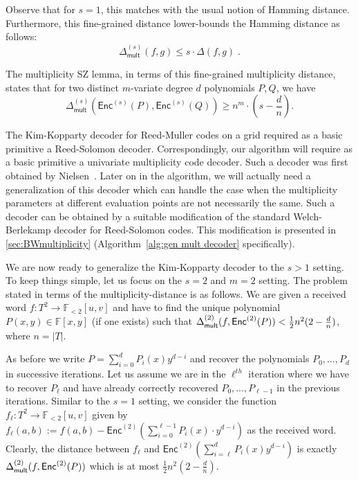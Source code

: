 \documentclass{theoretics}
\def\Field{\mathbb{F}}
\let\F\Field
\newcommand{\enc}{{\mathsf{Enc}}}
\begin{document}
	Observe that for $s=1$, this matches with the usual notion of Hamming
	distance. Furthermore, this fine-grained distance lower-bounds the
	Hamming distance as follows:
	\[ \Delta_{\mathsf{mult}}^{(s)}(f,g) \leq s \cdot \Delta(f,g)
	\;. \]
	
	The multiplicity SZ lemma, in terms of this fine-grained
	multiplicity distance, states that for two distinct $m$-variate degree $d$
	polynomials $P,Q$, we have
	\[\Delta_{\mathsf{mult}}^{(s)} (\enc^{(s)}(P),\enc^{(s)}(Q))\geq n^{m} \cdot \left(s - \frac{d}{n}\right).\]
	
	The Kim-Kopparty decoder for Reed-Muller codes on a grid required as a basic
	primitive a Reed-Solomon decoder. Correspondingly, our algorithm will
	require as a basic primitive a univariate multiplicity code
	decoder. Such a decoder was first obtained by
	Nielsen~\cite{Nielsen2001}. Later on in the algorithm, we will
	actually need a  generalization of this decoder which can
	handle the case when the multiplicity parameters at different
	evaluation points are not necessarily the same.  Such a decoder can be obtained by a
	suitable modification of the standard Welch-Berlekamp decoder for
	Reed-Solomon codes. This modification is presented in
	\cref{sec:BWmultiplicity} (Algorithm~\ref{alg:gen mult decoder} specifically). 
	
	We are now ready to generalize the Kim-Kopparty decoder to the $s>1$
	setting. To keep things simple, let us focus on the $s=2$ and $m=2$
	setting. The problem stated in terms of the multiplicity-distance is
	as follows. We are given a received word
	$f\colon T^2 \to \F_{<2}[u,v]$ and have to find the unique polynomial
	$P(x, y) \in \mathbb{F}[x, y]$ (if one exists) such that
	$\Delta_{\sf{mult}}^{(2)}(f,\enc^{(2)}(P)) < \frac{1}{2} n^2
	(2-\frac{d}{n})$, where $n=|T|$.
	
	
	As before we write $P= \sum_{i=0}^d P_i(x) y^{d-i}$ and recover the
	polynomials $P_0,\ldots, P_d$ in successive iterations. Let us assume
	we are in the $\ell^{th}$ iteration where we have to recover $P_\ell$ and
	have already correctly recovered $P_0,\ldots, P_{\ell-1}$ in the previous
	iterations. Similar to the $s=1$ setting, we consider the function $f_{\ell}\colon T^2 \to \F_{<2}[u,v]$
	given by
	$f_{\ell}(a,b) := f(a,b) - \enc^{(2)}\left(\sum_{i = 0}^{\ell-1}P_i(x)\cdot y^{d-i}\right)$ as
	the received word. Clearly, the distance between $f_{\ell}$
	and $\enc^{(2)}\left(\sum_{i = \ell}^d P_i(x)y^{d-i}\right)$ is exactly
	$\Delta_{\sf{mult}}^{(2)}(f,\enc^{(2)}(P))$ which is at most $\frac{1}{2}
	n^2 (2-\frac{d}{n})$.  
	
\end{document}

